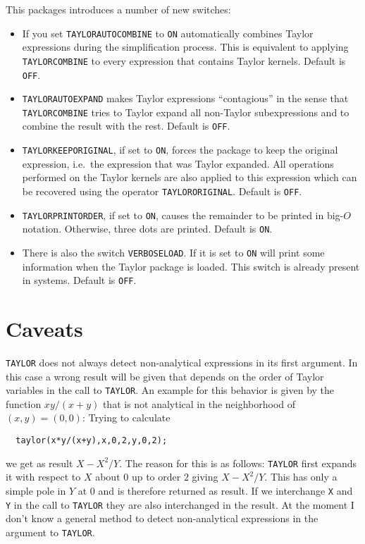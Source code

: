 This packages introduces a number of new switches:
\begin{itemize}

\item If you set \verb|TAYLORAUTOCOMBINE| to \verb|ON| \REDUCE{}
    automatically combines Taylor expressions during the simplification
    process.  This is equivalent to applying \verb|TAYLORCOMBINE| to
    every expression that contains Taylor kernels.
    Default is \verb|OFF|.

\item \verb|TAYLORAUTOEXPAND| makes Taylor expressions ``contagious''
    in the sense that \verb|TAYLORCOMBINE| tries to Taylor expand
    all non-Taylor subexpressions and to combine the result with the
    rest. Default is \verb|OFF|.

\item \verb|TAYLORKEEPORIGINAL|, if set to \verb|ON|, forces the
    package to keep the original expression, i.e.\ the expression
    that was Taylor expanded.  All operations performed on the
    Taylor kernels are also applied to this expression  which can
    be recovered using the operator \verb|TAYLORORIGINAL|.
    Default is \verb|OFF|.

\item \verb|TAYLORPRINTORDER|, if set to \verb|ON|, causes the
    remainder to be printed in big-$O$ notation.  Otherwise, three
    dots are printed. Default is \verb|ON|.

\item There is also the switch \verb|VERBOSELOAD|.  If it is set to
    \verb|ON|
    \REDUCE{} will print some information when the Taylor package is
    loaded.  This switch is already present in \PSL{} systems.
    Default is \verb|OFF|.

\end{itemize}

\section{Caveats}

\verb|TAYLOR| does not always detect non-analytical expressions in
its first argument.
In this case a wrong result will be given that depends on the order
of Taylor variables in the call to \verb|TAYLOR|.
An example for this behavior is given by the function $xy/(x+y)$ that is
not analytical in the neighborhood of $(x,y) = (0,0)$:
Trying to calculate
\begin{verbatim}
  taylor(x*y/(x+y),x,0,2,y,0,2);
\end{verbatim}
we get as result $X-X^{2}/Y$.
The reason for this is as follows:
\verb|TAYLOR| first expands it with respect to $X$ about $0$
up to order $2$ giving $X - X^{2}/Y$.
This has only a simple pole in $Y$ at $0$ and is therefore returned as
result.
If we interchange \verb|X| and \verb|Y| in the call to \verb|TAYLOR|
they are also interchanged in the result.
At the moment I don't know a general method to detect non-analytical
expressions in the argument to \verb|TAYLOR|.

